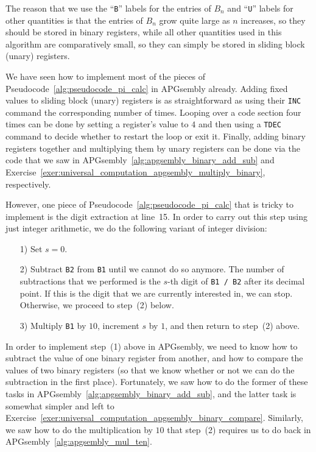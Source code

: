 The reason that we use the ``\texttt{B}'' labels for the entries of $B_n$ and ``\texttt{U}'' labels for other quantities is that the entries of $B_n$ grow quite large as $n$ increases, so they should be stored in binary registers, while all other quantities used in this algorithm are comparatively small, so they can simply be stored in sliding block (unary) registers.

We have seen how to implement most of the pieces of Pseudocode~\ref{alg:pseudocode_pi_calc} in APGsembly already. Adding fixed values to sliding block (unary) registers is as straightforward as using their \texttt{INC} command the corresponding number of times. Looping over a code section four times can be done by setting a register's value to $4$ and then using a \texttt{TDEC} command to decide whether to restart the loop or exit it. Finally, adding binary registers together and multiplying them by unary registers can be done via the code that we saw in APGsembly~\ref{alg:apgsembly_binary_add_sub} and Exercise~\ref{exer:universal_computation_apgsembly_multiply_binary}, respectively.

However, one piece of Pseudocode~\ref{alg:pseudocode_pi_calc} that is tricky to implement is the digit extraction at line~15. In order to carry out this step using just integer arithmetic, we do the following variant of integer division:\smallskip

\begin{enumerate}
	\item[1)] Set $s = 0$.\smallskip
	
	\item[2)] Subtract \texttt{B2} from \texttt{B1} until we cannot do so anymore. The number of subtractions that we performed is the $s$-th digit of \texttt{B1 / B2} after its decimal point. If this is the digit that we are currently interested in, we can stop. Otherwise, we proceed to step~(2) below.\smallskip
	
	\item[3)] Multiply \texttt{B1} by $10$, increment $s$ by $1$, and then return to step~(2) above.\smallskip
\end{enumerate}

In order to implement step~(1) above in APGsembly, we need to know how to subtract the value of one binary register from another, and how to compare the values of two binary registers (so that we know whether or not we can do the subtraction in the first place). Fortunately, we saw how to do the former of these tasks in APGsembly~\ref{alg:apgsembly_binary_add_sub}, and the latter task is somewhat simpler and left to Exercise~\ref{exer:universal_computation_apgsembly_binary_compare}. Similarly, we saw how to do the multiplication by $10$ that step~(2) requires us to do back in APGsembly~\ref{alg:apgsembly_mul_ten}.

